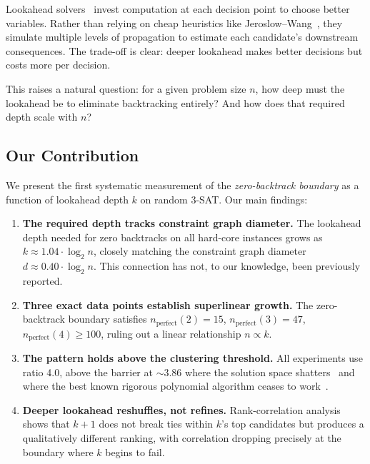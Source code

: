 \documentclass[11pt,a4paper]{article}
\begin{document}
Lookahead solvers~\citep{heule2009lookahead} invest computation at each decision point to choose better variables. Rather than relying on cheap heuristics like Jeroslow--Wang~\citep{jeroslow1990solving}, they simulate multiple levels of propagation to estimate each candidate's downstream consequences. The trade-off is clear: deeper lookahead makes better decisions but costs more per decision.

This raises a natural question: for a given problem size $n$, how deep must the lookahead be to eliminate backtracking entirely? And how does that required depth scale with $n$?

\subsection{Our Contribution}

We present the first systematic measurement of the \emph{zero-backtrack boundary} as a function of lookahead depth $k$ on random 3-SAT. Our main findings:

\begin{enumerate}
    \item \textbf{The required depth tracks constraint graph diameter.} The lookahead depth needed for zero backtracks on all hard-core instances grows as $k \approx 1.04 \cdot \log_2 n$, closely matching the constraint graph diameter $d \approx 0.40 \cdot \log_2 n$. This connection has not, to our knowledge, been previously reported.

    \item \textbf{Three exact data points establish superlinear growth.} The zero-backtrack boundary satisfies $n_{\mathrm{perfect}}(2) = 15$, $n_{\mathrm{perfect}}(3) = 47$, $n_{\mathrm{perfect}}(4) \geq 100$, ruling out a linear relationship $n \propto k$.

    \item \textbf{The pattern holds above the clustering threshold.} All experiments use ratio 4.0, above the barrier at ${\sim}3.86$ where the solution space shatters~\citep{achlioptas2008algorithmic} and where the best known rigorous polynomial algorithm ceases to work~\citep{cojaoghlan2010better}.

    \item \textbf{Deeper lookahead reshuffles, not refines.} Rank-correlation analysis shows that $k{+}1$ does not break ties within $k$'s top candidates but produces a qualitatively different ranking, with correlation dropping precisely at the boundary where $k$ begins to fail.
\end{enumerate}
\end{document}
